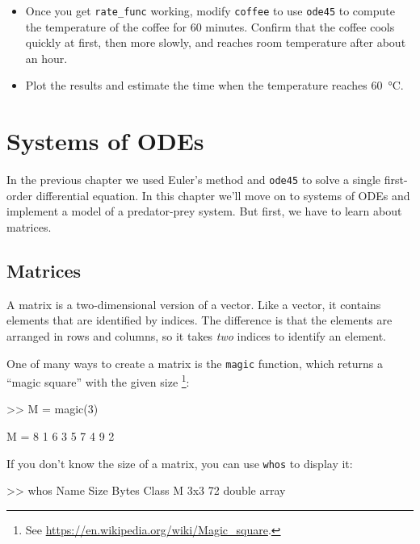 \documentclass[
]{book}
\numberwithin{Answer}{chapter}
\numberwithin{Exercise}{chapter}
\begin{document}
\begin{ex}
\begin{itemize}
\item Once you get {\tt rate\_func} working, modify
{\tt coffee} to use {\tt ode45} to compute the temperature
of the coffee for 60 minutes.  Confirm that
the coffee cools quickly at first, then more slowly, and reaches
room temperature after about an hour.

\item Plot the results and estimate the time when the temperature reaches \SI{60}{\celsius}.

\end{itemize}

\end{ex}


\chapter{Systems of ODEs}

In the previous chapter we used Euler's method and {\tt ode45} to solve a single first-order differential equation.  In this chapter we'll move on to systems of ODEs and implement a model of a predator-prey system.  But first, we have to learn about matrices.


\section{Matrices}

A matrix is a two-dimensional version of a vector.  Like a vector,
it contains elements that are identified by indices.  The difference
is that the elements are arranged in rows and columns, so it takes
{\em two} indices to identify an element.

One of many ways to create a matrix is the {\tt magic} function,
which returns a ``magic square'' with the given size 
\footnote{See \url{https://en.wikipedia.org/wiki/Magic_square}.}:


\begin{code}
>> M = magic(3)

M =  8     1     6
     3     5     7
     4     9     2
\end{code}

If you don't know the size of a matrix, you can use {\tt whos} to
display it:

\begin{code}
>> whos
  Name        Size                    Bytes  Class
  M           3x3                        72  double array
\end{code}
\end{document}
